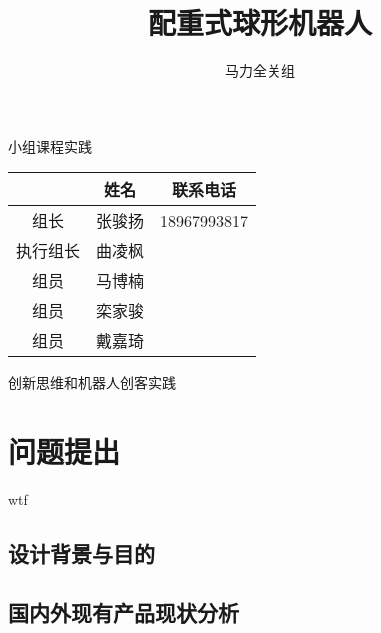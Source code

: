 \documentclass[a4paper]{ctexart}
\title{配重式球形机器人}
\author{马力全关组}
\newcommand{ \upcite}[1]{\textsuperscript{\textsuperscript{\cite{#1} } }}
\numberwithin{equation}{section}
\numberwithin{table}{section}
\numberwithin{figure}{section}
\begin{document}


\begin{titlepage}

  \maketitle
  \begin{center}
    小组课程实践
  \end{center}


  \begin{longtable}[]{@{}ccc@{}}
  \toprule
   & 姓名 & 联系电话\tabularnewline
  \midrule
  \endhead
  组长 & 张骏扬 & 18967993817\tabularnewline
  执行组长 & 曲凌枫 & \tabularnewline
  组员 & 马博楠 & \tabularnewline
  组员 & 栾家骏 & \tabularnewline
  组员 & 戴嘉琦 & \tabularnewline
  \bottomrule
  \end{longtable}
  \addtocounter{table}{-1}

  
\begin{center}
  创新思维和机器人创客实践
\end{center}

\thispagestyle{empty}

\end{titlepage}

\addtocounter{page}{-2}

\newpage

\thispagestyle{fancy}
\lhead{}
\chead{\it\small{\textcolor{grey}{目录}}}
\rhead{}
\cfoot{}

\tableofcontents

\newpage


\pagestyle{fancy}
\fancyhead[RE, LO]{\it\small\rightmark}
\fancyhead[C]{\small{\it\textcolor{grey}{配重式球形机器人}}}

\section{问题提出}

wtf\upcite{国务院人口普查办公室2012中国}
\subsection{设计背景与目的}

\subsection{国内外现有产品现状分析}
\end{document}
